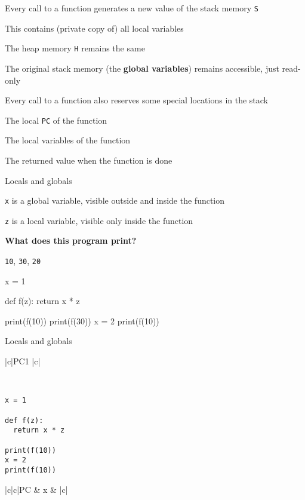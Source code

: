 \documentclass{beamer}
\begin{document}
\begin{slide}{
\item Every call to a function generates a new value of the stack memory \texttt{S}
\item This contains (private copy of) all local variables
\item The heap memory \texttt{H} remains the same
\item The original stack memory (the \textbf{global variables}) remains accessible, just read-only 
}\end{slide}

\begin{slide}{
\item Every call to a function also reserves some special locations in the stack
\item The local \texttt{PC} of the function
\item The local variables of the function
\item The returned value when the function is done
}\end{slide}

\begin{frame}[fragile]{Locals and globals}
\begin{codewithblock}{\item \texttt{x} is a global variable, visible outside and inside the function \item \texttt{z} is a local variable, visible only inside the function \pause \item \textbf{What does this program print?} \pause \item \texttt{10}, \texttt{30}, \texttt{20}}
x = 1

def f(z):
  return x * z

print(f(10))
print(f(30))
x = 2
print(f(10))
\end{codewithblock}
\end{frame}

\begin{frame}[fragile]{Locals and globals}
\begin{memorytable}
{|c|}{PC}{1}
{|c|}{}{}
\end{memorytable} \ \\

\begin{lstlisting}
x = 1

def f(z):
  return x * z

print(f(10))
x = 2
print(f(10))
\end{lstlisting}

\pause

\begin{memorytable}
{|c|c|}{PC & x}{ & }
{|c|}{}{}
\end{memorytable} \ \\
\end{frame}
\end{document}
